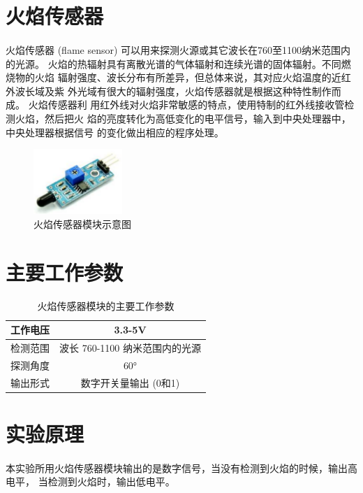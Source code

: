 \documentclass[UTF8, oneside]{ctexbook}
\begin{document}
\section{火焰传感器}
\paragraph{}
火焰传感器 (flame sensor) 可以用来探测火源或其它波长在760至1100纳米范围内的光源。
火焰的热辐射具有离散光谱的气体辐射和连续光谱的固体辐射。不同燃烧物的火焰
辐射强度、波长分布有所差异，但总体来说，其对应火焰温度的近红外波长域及紫
外光域有很大的辐射强度，火焰传感器就是根据这种特性制作而成。 火焰传感器利
用红外线对火焰非常敏感的特点，使用特制的红外线接收管检测火焰，然后把火
焰的亮度转化为高低变化的电平信号，输入到中央处理器中，中央处理器根据信号
的变化做出相应的程序处理。

\begin{figure}[h]
    \centering
    \includegraphics[width=0.3\textwidth]{./result/sensor/9/sensor.png}
    \caption{火焰传感器模块示意图}
    \label{9_sensor}
\end{figure}

\section{主要工作参数}
\begin{table}[h]
    \centering
    \begin{tabular}{|c|c|}
    \hline
    工作电压 & 3.3-5V             \\ \hline
    检测范围 & 波长 760-1100 纳米范围内的光源 \\ \hline
    探测角度 & 60°                \\ \hline
    输出形式 & 数字开关量输出 (0和1)      \\ \hline
    \end{tabular}
    \caption{火焰传感器模块的主要工作参数}
\end{table}

\section{实验原理}
\paragraph{}
本实验所用火焰传感器模块输出的是数字信号，当没有检测到火焰的时候，输出高电平，
当检测到火焰时，输出低电平。
\end{document}
